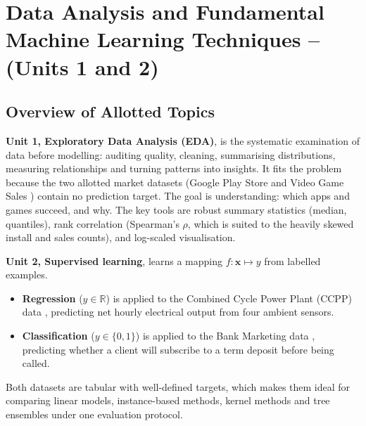 \chapter{Data Analysis and Fundamental Machine Learning Techniques – (Units 1 and 2)}

\section{Overview of Allotted Topics}
\textbf{Unit 1, Exploratory Data Analysis (EDA)}, is the systematic examination of data before modelling: auditing
quality, cleaning, summarising distributions, measuring relationships and turning patterns into insights. It fits the
problem because the two allotted market datasets (Google Play Store \cite{playstore} and Video Game Sales \cite{vgsales}) contain no prediction target.
The goal is understanding: which apps and games succeed, and why. The key tools are robust summary statistics (median,
quantiles), rank correlation (Spearman's $\rho$, which is suited to the heavily skewed install and sales counts), and
log-scaled visualisation.

\textbf{Unit 2, Supervised learning}, learns a mapping $f:\mathbf{x}\mapsto y$ from labelled examples.
\begin{itemize}
\item \textbf{Regression} ($y\in\mathbb{R}$) is applied to the Combined Cycle Power Plant (CCPP) data \cite{tufekci}, predicting
net hourly electrical output from four ambient sensors.
\item \textbf{Classification} ($y\in\{0,1\}$) is applied to the Bank Marketing data \cite{moro}, predicting whether a client will
subscribe to a term deposit before being called.
\end{itemize}
Both datasets are tabular with well-defined targets, which makes them ideal for comparing linear models, instance-based
methods, kernel methods and tree ensembles under one evaluation protocol.

